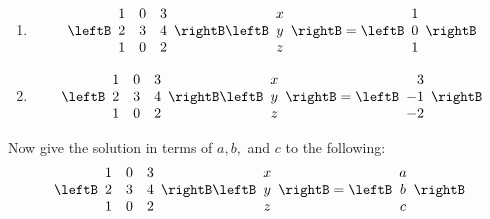 \begin{enumialphparenastyle}
\begin{ex}
\begin{enumerate}
\item
\begin{equation*}
\leftB
\begin{array}{rrr}
1 & 0 & 3 \\
2 & 3 & 4 \\
1 & 0 & 2
\end{array}
\rightB \leftB
\begin{array}{c}
x \\
y \\
z
\end{array}
\rightB =\leftB
\begin{array}{r}
1 \\
0 \\
1
\end{array}
\rightB 
\end{equation*}

\item
\begin{equation*}
\leftB
\begin{array}{rrr}
1 & 0 & 3 \\
2 & 3 & 4 \\
1 & 0 & 2
\end{array}
\rightB \leftB
\begin{array}{c}
x \\
y \\
z
\end{array}
\rightB =\leftB
\begin{array}{r}
3 \\
-1 \\
-2
\end{array}
\rightB 
\end{equation*}
\end{enumerate}

Now give the solution in terms of $a,b,$ and $c$ to the following:
\begin{equation*}
\leftB
\begin{array}{rrr}
1 & 0 & 3 \\
2 & 3 & 4 \\
1 & 0 & 2
\end{array}
\rightB \leftB
\begin{array}{c}
x \\
y \\
z
\end{array}
\rightB =\leftB
\begin{array}{c}
a \\
b \\
c
\end{array}
\rightB 
\end{equation*}


\end{ex}
\end{enumialphparenastyle}

